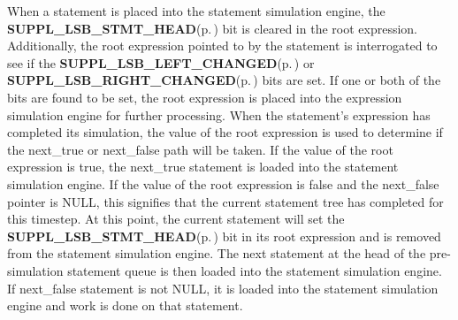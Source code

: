 \begin{Desc}
\item[]When a statement is placed into the statement simulation engine, the {\bf SUPPL\_\-LSB\_\-STMT\_\-HEAD}{\rm (p.\,\pageref{group__expr__suppl_a4})} bit is cleared in the root expression. Additionally, the root expression pointed to by the statement is interrogated to see if the {\bf SUPPL\_\-LSB\_\-LEFT\_\-CHANGED}{\rm (p.\,\pageref{group__expr__suppl_a9})} or {\bf SUPPL\_\-LSB\_\-RIGHT\_\-CHANGED}{\rm (p.\,\pageref{group__expr__suppl_a10})} bits are set. If one or both of the bits are found to be set, the root expression is placed into the expression simulation engine for further processing. When the statement's expression has completed its simulation, the value of the root expression is used to determine if the next\_\-true or next\_\-false path will be taken. If the value of the root expression is true, the next\_\-true statement is loaded into the statement simulation engine. If the value of the root expression is false and the next\_\-false pointer is NULL, this signifies that the current statement tree has completed for this timestep. At this point, the current statement will set the {\bf SUPPL\_\-LSB\_\-STMT\_\-HEAD}{\rm (p.\,\pageref{group__expr__suppl_a4})} bit in its root expression and is removed from the statement simulation engine. The next statement at the head of the pre-simulation statement queue is then loaded into the statement simulation engine. If next\_\-false statement is not NULL, it is loaded into the statement simulation engine and work is done on that statement.\end{Desc}
